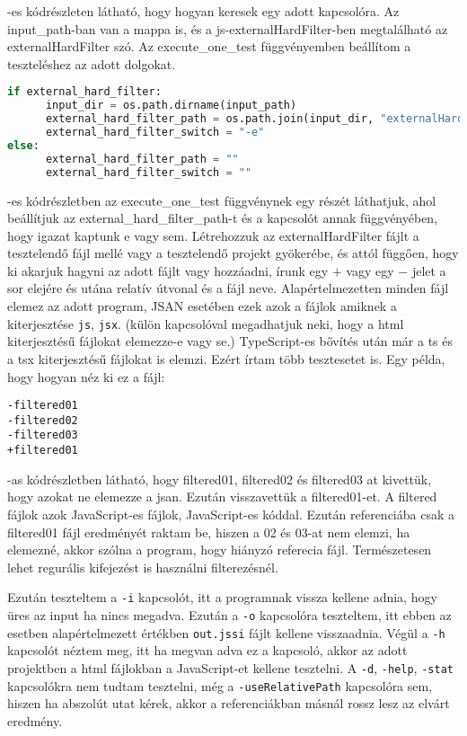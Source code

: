 -es kódrészleten látható, hogy hogyan keresek egy adott kapcsolóra. Az input\_path-ban van a mappa is, és a js-externalHardFilter-ben megtalálható az externalHardFilter szó.
Az execute\_one\_test függvényemben beállítom a teszteléshez az adott dolgokat.

\begin{lstlisting}[caption={JSAN kapcsoló beállítása pythonban}, label={lst:python_kapcsolo_beallitasa}, language={Python}]
if external_hard_filter:
      input_dir = os.path.dirname(input_path)
      external_hard_filter_path = os.path.join(input_dir, "externalHardFilter.txt")
      external_hard_filter_switch = "-e"
else:
      external_hard_filter_path = ""
      external_hard_filter_switch = ""
\end{lstlisting}

-es kódrészletben az execute\_one\_test függvénynek egy részét láthatjuk, ahol beállítjuk az external\_hard\_filter\_path-t és a kapcsolót annak függvényében, hogy igazat kaptunk e vagy sem.
Létrehozzuk az externalHardFilter fájlt a tesztelendő fájl mellé vagy a tesztelendő projekt gyökerébe,
és attól függően, hogy ki akarjuk hagyni az adott fájlt vagy hozzáadni, írunk egy $+$ vagy egy $-$ jelet a sor elejére és utána relatív útvonal és a fájl neve.
Alapértelmezetten minden fájl elemez az adott program, JSAN esetében ezek azok a fájlok amiknek a kiterjesztése \texttt{js}, \texttt{jsx}. (külön kapcsolóval megadhatjuk neki, hogy a html kiterjesztésű fájlokat elemezze-e vagy se.)
TypeScript-es bővítés után már a ts és a tsx kiterjesztésű fájlokat is elemzi. Ezért írtam több tesztesetet is. Egy példa, hogy hogyan néz ki ez a fájl:

\begin{lstlisting}[caption={ExternalHardFilter fájl}, label={lst:external_hard_filter}]
-filtered01
-filtered02
-filtered03
+filtered01
\end{lstlisting}

-as kódrészletben látható, hogy filtered01, filtered02 és filtered03 at kivettük, hogy azokat ne elemezze a jsan.
Ezután visszavettük a filtered01-et. A filtered fájlok azok JavaScript-es fájlok, JavaScript-es kóddal.
Ezután referenciába csak a filtered01 fájl eredményét raktam be, hiszen a 02 és 03-at nem elemzi, ha elemezné, akkor szólna a program, hogy hiányzó referecia fájl.
Természetesen lehet regurális kifejezést is használni filterezésnél.


Ezután teszteltem a \texttt{-i} kapcsolót, itt a programnak vissza kellene adnia, hogy üres az input ha nincs megadva.
Ezután a \texttt{-o} kapcsolóra teszteltem, itt ebben az esetben alapértelmezett értékben \texttt{out.jssi} fájlt kellene visszaadnia.
Végül a \texttt{-h} kapcsolót néztem meg, itt ha megvan adva ez a kapcsoló, akkor az adott projektben a html fájlokban a JavaScript-et kellene tesztelni.
A \texttt{-d}, \texttt{-help}, \texttt{-stat} kapcsolókra nem tudtam tesztelni, még a \texttt{-useRelativePath} kapcsolóra sem, hiszen ha abszolút utat kérek, akkor a referenciákban másnál rossz lesz az elvárt eredmény.


